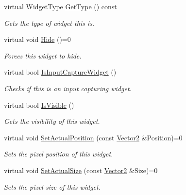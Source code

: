 \begin{DoxyCompactItemize}
virtual WidgetType \hyperlink{classphys_1_1UI_1_1Widget_a76337b279bd372ce225f94ab1da191ea}{GetType} () const 
\begin{DoxyCompactList}\small\item\em Gets the type of widget this is. \item\end{DoxyCompactList}\item 
\hypertarget{classphys_1_1UI_1_1Widget_abc8e3f88f780e3b36b38086c45311795}{
virtual void \hyperlink{classphys_1_1UI_1_1Widget_abc8e3f88f780e3b36b38086c45311795}{Hide} ()=0}
\label{classphys_1_1UI_1_1Widget_abc8e3f88f780e3b36b38086c45311795}

\begin{DoxyCompactList}\small\item\em Forces this widget to hide. \item\end{DoxyCompactList}\item 
virtual bool \hyperlink{classphys_1_1UI_1_1Widget_af8498cbe2d6cf37115cf8ade52e22557}{IsInputCaptureWidget} ()
\begin{DoxyCompactList}\small\item\em Checks if this is an input capturing widget. \item\end{DoxyCompactList}\item 
virtual bool \hyperlink{classphys_1_1UI_1_1Widget_ac9662d5cfef5b1861e85bff7b7ca90c4}{IsVisible} ()
\begin{DoxyCompactList}\small\item\em Gets the visibility of this widget. \item\end{DoxyCompactList}\item 
virtual void \hyperlink{classphys_1_1UI_1_1Widget_a77727351d98b10f1f4eb45048cb882e3}{SetActualPosition} (const \hyperlink{classphys_1_1Vector2}{Vector2} \&Position)=0
\begin{DoxyCompactList}\small\item\em Sets the pixel position of this widget. \item\end{DoxyCompactList}\item 
virtual void \hyperlink{classphys_1_1UI_1_1Widget_acda63a62fa158d5fe00c86f50e5c120d}{SetActualSize} (const \hyperlink{classphys_1_1Vector2}{Vector2} \&Size)=0
\begin{DoxyCompactList}\small\item\em Sets the pixel size of this widget. \item\end{DoxyCompactList}\item 

\end{DoxyCompactItemize}
